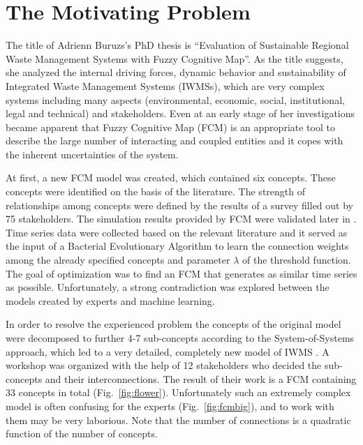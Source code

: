 \documentclass[graybox]{svmult}
\begin{document}
\section{The Motivating Problem}
\label{sec:motivatingProblem}

The title of Adrienn Buruzs's PhD thesis \cite{buruzsphd2015} is ``Evaluation of Sustainable Regional Waste Management Systems with Fuzzy Cognitive Map''. As the title suggests, she analyzed the internal driving forces, dynamic behavior and sustainability of Integrated Waste Management Systems (IWMSs), which are very complex systems including many aspects (environmental, economic, social, institutional, legal and technical) and stakeholders. Even at an early stage of her investigations became apparent that Fuzzy Cognitive Map (FCM) is an appropriate tool to describe the large number of interacting and coupled entities and it copes with the inherent uncertainties of the system.

At first, a new FCM model \cite{buruzs2013developing} was created, which contained six concepts. These concepts were identified on the basis of the literature. The strength of relationships among concepts were defined by the results of a survey filled out by 75 stakeholders. The simulation results provided by FCM were validated later in \cite{buruzs2013advanced}. Time series data were collected based on the relevant literature and it served as the input of a Bacterial Evolutionary Algorithm to learn the connection weights among the already specified concepts and parameter $\lambda$ of the threshold function. The goal of optimization was to find an FCM that generates as similar time series as possible. Unfortunately, a strong contradiction was explored between the models created by experts and machine learning.

In order to resolve the experienced problem the concepts of the original model were decomposed to further 4-7 sub-concepts according to the System-of-Systems approach, which led to a very detailed, completely new model of IWMS \cite{buruzs2013modeling}. A workshop was organized with the help of 12 stakeholders who decided the sub-concepts and their interconnections. The result of their work is a FCM containing 33 concepts in total (Fig.~\ref{fig:flower}). Unfortunately such an extremely complex model is often confusing for the experts (Fig.~\ref{fig:fcmbig}), and to work with them  may be very laborious. Note that the number of connections is a quadratic function of the number of concepts.
\end{document}
